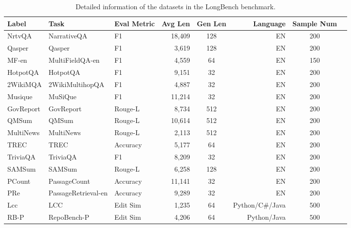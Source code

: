 \begin{table*}
    \centering
    \caption{Detailed information of the datasets in the LongBench benchmark.}
    \label{tab:longbench_datasets_simplified}
    \setlength{\tabcolsep}{5pt} 
    \begin{tabular}{lllrcrcr}
        \toprule
        \textbf{Label} & \textbf{Task} & \textbf{Eval Metric} & \textbf{Avg Len} & \textbf{Gen Len} & \textbf{Language} & \textbf{Sample Num} \\
        \midrule
        NrtvQA & NarrativeQA & F1 & 18,409 & 128 & EN & 200 \\
        Qasper & Qasper & F1 & 3,619 & 128 & EN & 200 \\
        MF-en & MultiFieldQA-en & F1 & 4,559 & 64 & EN & 150 \\
        HotpotQA & HotpotQA & F1 & 9,151 & 32 & EN & 200 \\
        2WikiMQA & 2WikiMultihopQA & F1 & 4,887 & 32 & EN & 200 \\
        Musique & MuSiQue & F1 & 11,214 & 32 & EN & 200 \\
        GovReport & GovReport & Rouge-L & 8,734 & 512 & EN & 200 \\
        QMSum & QMSum & Rouge-L & 10,614 & 512 & EN & 200 \\
        MultiNews & MultiNews & Rouge-L & 2,113 & 512 & EN & 200 \\
        TREC & TREC & Accuracy & 5,177 & 64 & EN & 200 \\
        TriviaQA & TriviaQA & F1 & 8,209 & 32 & EN & 200 \\
        SAMSum & SAMSum & Rouge-L & 6,258 & 128 & EN & 200 \\
        PCount & PassageCount & Accuracy & 11,141 & 32 & EN & 200 \\
        PRe & PassageRetrieval-en & Accuracy & 9,289 & 32 & EN & 200 \\
        Lcc & LCC & Edit Sim & 1,235 & 64 & Python/C\#/Java & 500 \\
        RB-P & RepoBench-P & Edit Sim & 4,206 & 64 & Python/Java & 500 \\
        \bottomrule
    \end{tabular}
\end{table*}

